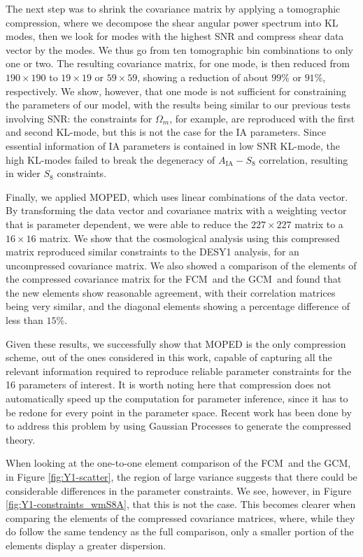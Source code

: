 \documentclass[aps, prd, twocolumn, superscriptaddress, nofootinbib, amssymb, amsmath]{revtex4-2}
\newcommand{\rf}[1]{Figure \ref{fig:#1}}
\newcommand\full{the FCM}
\newcommand\gaussian{the GCM}
\begin{document}
The next step was to shrink the covariance matrix by applying a tomographic compression, where we decompose the shear angular power spectrum into KL modes, then we look for modes with the highest SNR and compress shear data vector by the modes. We thus go from ten tomographic bin combinations to only one or two. The resulting covariance matrix, for one mode, is then reduced from $190 \times 190$ to $19 \times 19$ or $59 \times 59$, showing a reduction of about $99\%$ or $91\%$, respectively. We show, however, that one mode is not sufficient for constraining the parameters of our model, with the results being similar to our previous tests involving SNR: the constraints for $\Omega_m$, for example, are reproduced with the first and second KL-mode, but this is not the case for the IA parameters. Since essential information of IA parameters is contained in low SNR KL-mode, the high KL-modes failed to break the degeneracy of $A_{\text{IA}}-S_8$ correlation, resulting in wider $S_8$ constraints. 

Finally, we applied MOPED, which uses linear combinations of the data vector. By transforming the data vector and covariance matrix with a weighting vector that is parameter dependent, we were able to reduce the $227 \times 227$ matrix to a $16 \times 16$ matrix. We show that the cosmological analysis using this compressed matrix reproduced similar constraints to the DESY1 analysis, for an uncompressed covariance matrix. We also showed a comparison of the elements of the compressed covariance matrix for \full\ and \gaussian\ and found that the new elements show reasonable agreement, with their correlation matrices being very similar, and the diagonal elements showing a percentage difference of less than $15\%$.

Given these results, we successfully show that MOPED is the only compression scheme, out of the ones considered in this work, capable of capturing all the relevant information required to reproduce reliable parameter constraints for the 16 parameters of interest. It is worth noting here that compression does not automatically speed up the computation for parameter inference, since it has to be redone for every point in the parameter space. Recent work has been done by \cite{Mootoovaloo:2020} to address this problem by using Gaussian Processes to generate the compressed theory.

When looking at the one-to-one element comparison of \full\ and \gaussian, in \rf{Y1-scatter}, the region of large variance suggests that there could be considerable differences in the parameter constraints. We see, however, in \rf{Y1-constraints_wmS8A}, that this is not the case. This becomes clearer when comparing the elements of the compressed covariance matrices, where, while they do follow the same tendency as the full comparison, only a smaller portion of the elements display a greater dispersion. 
\end{document}
